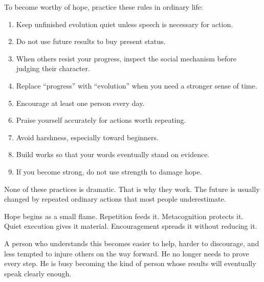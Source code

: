 To become worthy of hope, practice these rules in ordinary life:

\begin{enumerate}
\item Keep unfinished evolution quiet unless speech is necessary for action.
\item Do not use future results to buy present status.
\item When others resist your progress, inspect the social mechanism before judging their character.
\item Replace ``progress'' with ``evolution'' when you need a stronger sense of time.
\item Encourage at least one person every day.
\item Praise yourself accurately for actions worth repeating.
\item Avoid harshness, especially toward beginners.
\item Build works so that your words eventually stand on evidence.
\item If you become strong, do not use strength to damage hope.
\end{enumerate}

None of these practices is dramatic. That is why they work. The future is usually changed by repeated ordinary actions that most people underestimate.

Hope begins as a small flame. Repetition feeds it. Metacognition protects it. Quiet execution gives it material. Encouragement spreads it without reducing it.

A person who understands this becomes easier to help, harder to discourage, and less tempted to injure others on the way forward. He no longer needs to prove every step. He is busy becoming the kind of person whose results will eventually speak clearly enough.

